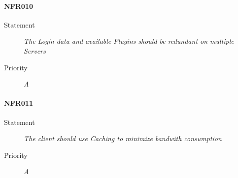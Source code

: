\paragraph{NFR010}
\begin{description}
  \item [Statement] \textit{The Login data and available \gls{Plugins} should be redundant on multiple Servers}
  \item [Priority] \textit{A}
\end{description}

\paragraph{NFR011}
\begin{description}
  \item [Statement] \textit{The client should use \gls{Caching} to minimize bandwith consumption}
  \item [Priority] \textit{A}
\end{description}
